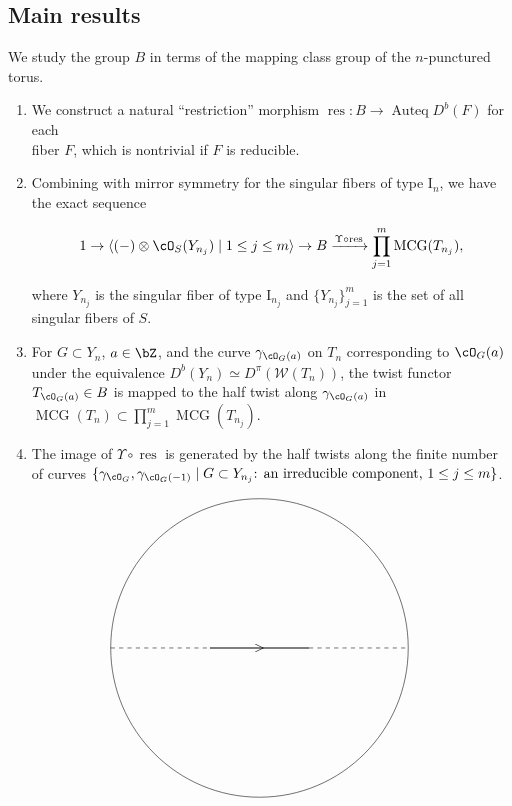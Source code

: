 \documentclass[a0,landscape]{a0poster}
\theoremstyle{plain}
\theoremstyle{definition}
\DeclareMathOperator{\Auteq}{\mathrm{Auteq}}
\DeclareMathOperator{\MCG}{\mathrm{MCG}}
\DeclareMathOperator{\res}{\mathrm{res}}
\begin{document}
\begin{multicols}{3}
    \subsection{Main results}
    \color{DarkSlateGray}
    We study the group $B$ in terms of the mapping class group of the $n$-punctured torus.
    \begin{enumerate}
        \item \colorbox{green!10!white}{We construct a natural ``restriction'' morphism $\res \colon B \to \Auteq{D^b(F)}$ for each }\\\colorbox{green!10!white}{fiber $F$, which is nontrivial if $F$ is reducible.}
        \item Combining with mirror symmetry for the singular fibers of type $\textrm{I}_n$, we have the exact sequence
              \begin{tcolorbox}[
                      colback = green!10!white,
                      colframe = green!10!white,
                      fonttitle = \bfseries,
                      breakable = true]
                  \begin{equation*}
                      1 \to \langle (-)\otimes \cO_S(Y_{n_j}) \mid 1 \leq j \leq m\rangle \to B \xrightarrow{\Upsilon \circ \res} \prod_{j=1}^m \MCG(T_{n_j}),
                  \end{equation*}\end{tcolorbox}
              where $Y_{n_j}$ is the singular fiber of type $\textrm{I}_{n_j}$ and $\{Y_{n_j}\}_{j=1}^m$ is the set of all singular fibers of $S$.

        \item For $G \subset Y_{n}$, $a \in \bZ$, and the curve $\gamma_{\cO_G(a)}$ on $T_{n}$ corresponding to $\cO_{G}(a)$ under the equivalence $D^b(Y_n) \simeq D^\pi(\mathcal{W}(T_n))$, \colorbox{green!10!white}{the twist functor $T_{\cO_G(a)} \in B$ is mapped} \colorbox{green!10!white}{to the half twist along $\gamma_{\cO_G(a)}$ in $\MCG(T_n) \subset \prod_{j=1}^m \MCG(T_{n_j})$.}
        \item The image of $\Upsilon \circ \res$ is generated by the half twists along the finite number of curves $\{\gamma_{\cO_G}, \gamma_{\cO_G(-1)} \mid G \subset Y_{n_j}\text{: an irreducible component, } 1 \leq j \leq m \}$.
    \end{enumerate}

    \begin{center}
        \centering
        \begin{displaymath}
            \begin{tikzpicture}[scale=2.5]
                \draw (0, 1.5) circle[radius=1.5];
                \draw[thick] (-0.5, 1.5)--(0.5, 1.5);
                \draw(0, 1.5) node{$>$};
                \draw[dashed] (-1.5, 1.5)--(-0.5, 1.5);
                \draw[dashed] (0.5, 1.5)--(1.5, 1.5);


\end{tikzpicture}
\end{displaymath}
\end{center}
\end{multicols}
\end{document}
